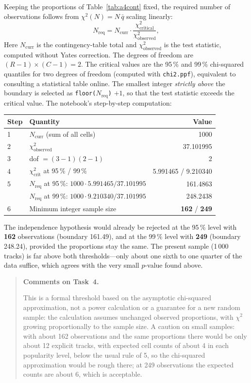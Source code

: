 \documentclass[11pt,letterpaper]{article}
\newenvironment{taskcomments}[1][Comments]{%
  \par\medskip\noindent
  \begin{quote}\small\textbf{#1.}\enspace\ignorespaces
}{%
  \end{quote}\medskip
}
\begin{document}
Keeping the proportions of Table~\ref{tab:a4cont} fixed, the required number
of observations follows from $\chi^2(N) = N\,\bar{q}$ scaling linearly:
\begin{equation}
  N_{\mathrm{req}} = N_{\mathrm{curr}} \cdot
  \frac{\chi^2_{\mathrm{critical}}}{\chi^2_{\mathrm{observed}}} ,
\end{equation}
Here $N_{\mathrm{curr}}$ is the contingency-table total and
$\chi^2_{\mathrm{observed}}$ is the test statistic, computed without Yates
correction. The degrees of freedom are $(R-1)\times(C-1) = 2$.
The critical values are the 95\,\% and 99\,\% chi-squared quantiles for two
degrees of freedom (computed with \texttt{chi2.ppf}), equivalent to consulting
a statistical table online. The smallest integer \emph{strictly
above} the boundary is selected as \texttt{floor($N_{\mathrm{req}}$)} $+ 1$,
so that the test statistic exceeds the critical value. The notebook's
step-by-step computation:
\begin{center}
\small
\begin{tabular}{llr}
\toprule
Step & Quantity & Value \\
\midrule
1 & $N_{\mathrm{curr}}$ (sum of all cells) & 1000 \\
2 & $\chi^2_{\mathrm{observed}}$ & 37.101995 \\
3 & dof $= (3-1)(2-1)$ & 2 \\
4 & $\chi^2_{\mathrm{crit}}$ at 95\,\% / 99\,\% & 5.991465 / 9.210340 \\
5 & $N_{\mathrm{req}}$ at 95\,\%: $1000 \cdot 5.991465 / 37.101995$ & 161.4863 \\
  & $N_{\mathrm{req}}$ at 99\,\%: $1000 \cdot 9.210340 / 37.101995$ & 248.2438 \\
6 & Minimum integer sample size & \textbf{162} / \textbf{249} \\
\bottomrule
\end{tabular}
\end{center}
The independence hypothesis would already be rejected at the 95\,\% level
with \textbf{162} observations (boundary 161.49), and at the 99\,\% level
with \textbf{249} (boundary 248.24), provided the proportions stay the same.
The present sample (1\,000 tracks) is far above both thresholds---only about
one sixth to one quarter of the data suffice, which agrees with the very
small $p$-value found above.

\begin{taskcomments}[Comments on Task~4]
This is a formal threshold based on the asymptotic chi-squared
approximation, not a power calculation or a guarantee for a new random
sample: the calculation assumes unchanged observed proportions, with $\chi^2$
growing proportionally to the sample size. A caution on small samples: with
about 162 observations and the same proportions there would be only about 12
explicit tracks, with expected cell counts of about 4 in each popularity
level, below the usual rule of 5, so the chi-squared approximation would be
rough there; at 249 observations the expected counts are about 6, which is
acceptable.
\end{taskcomments}
\end{document}
